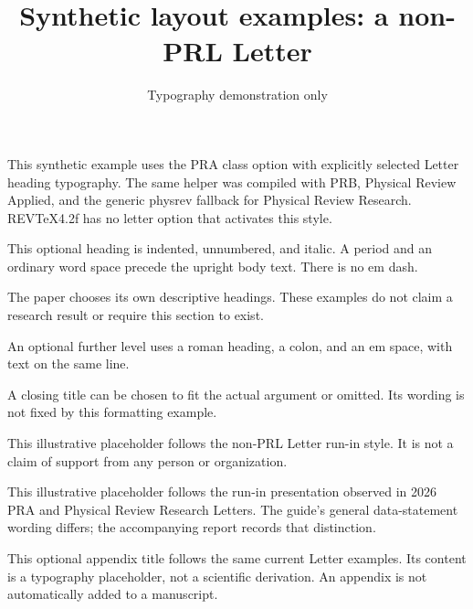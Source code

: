 \documentclass[aps,pra,reprint]{revtex4-2}
\begin{document}
\title{Synthetic layout examples: a non-PRL Letter}
\author{Typography demonstration only}\noaffiliation
\maketitle
\noindent This synthetic example uses the PRA class option with explicitly selected Letter heading typography. The same helper was compiled with PRB, Physical Review Applied, and the generic physrev fallback for Physical Review Research. REVTeX4.2f has no letter option that activates this style.

This optional heading is indented, unnumbered, and italic. A period and an ordinary word space precede the upright body text. There is no em dash.

The paper chooses its own descriptive headings. These examples do not claim a research result or require this section to exist.

An optional further level uses a roman heading, a colon, and an em space, with text on the same line.

A closing title can be chosen to fit the actual argument or omitted. Its wording is not fixed by this formatting example.

This illustrative placeholder follows the non-PRL Letter run-in style. It is not a claim of support from any person or organization.

This illustrative placeholder follows the run-in presentation observed in 2026 PRA and Physical Review Research Letters. The guide's general data-statement wording differs; the accompanying report records that distinction.

This optional appendix title follows the same current Letter examples. Its content is a typography placeholder, not a scientific derivation. An appendix is not automatically added to a manuscript.
\end{document}
